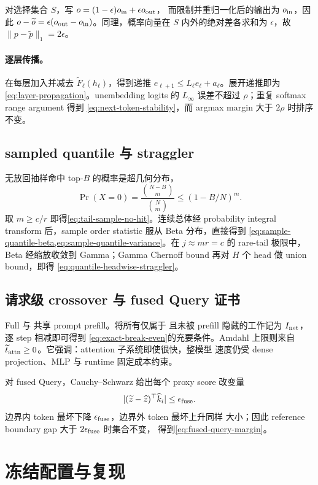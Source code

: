 对选择集合 $S$，写
$o=(1-\epsilon)o_{\rm in}+\epsilon o_{\rm out}$，
而限制并重归一化后的输出为 $o_{\rm in}$，因此
$o-\widetilde o=\epsilon(o_{\rm out}-o_{\rm in})$。同理，概率向量在
$S$ 内外的绝对差各求和为 $\epsilon$，故
$\|p-\widetilde p\|_1=2\epsilon$。

\paragraph{逐层传播。}
在每层加入并减去 $\widetilde F_\ell(h_\ell)$，得到递推
$e_{\ell+1}\le L_\ell e_\ell+a_\ell$。展开递推即为
\cref{eq:layer-propagation}。unembedding logits 的
$L_\infty$ 误差不超过 $\rho$；重复 softmax range argument 得到
\cref{eq:next-token-stability}，而 argmax margin 大于 $2\rho$ 时排序不变。

\subsection{sampled quantile 与 straggler}

无放回抽样命中 top-$B$ 的概率是超几何分布，
\[
 \Pr(X=0)=\frac{\binom{N-B}{m}}{\binom Nm}
 \le(1-B/N)^m.
\]
取 $m\ge c/r$ 即得\cref{eq:tail-sample-no-hit}。连续总体经 probability
integral transform 后，sample order statistic 服从 Beta 分布，直接得到
\cref{eq:sample-quantile-beta,eq:sample-quantile-variance}。在
$j\approx mr=c$ 的 rare-tail 极限中，Beta 经缩放收敛到 Gamma；Gamma
Chernoff bound 再对 $H$ 个 head 做 union bound，即得
\cref{eq:quantile-headwise-straggler}。

\subsection{请求级 crossover 与 fused Query 证书}

Full 与 \method 共享 prompt prefill。将所有仅属于 \method 且未被 prefill
隐藏的工作记为 $I_{\rm net}$，逐 step 相减即可得到
\cref{eq:exact-break-even}的充要条件。Amdahl 上限则来自
$\widetilde t_{\rm attn}\ge0$。它强调：attention 子系统即使很快，整模型
速度仍受 dense projection、MLP 与 runtime 固定成本约束。

对 fused Query，Cauchy--Schwarz 给出每个 proxy score 改变量
\[
 |(\widetilde z-\widehat z)^\top\widehat k_i|
 \le\epsilon_{\rm fuse}.
\]
边界内 token 最坏下降 $\epsilon_{\rm fuse}$，边界外 token 最坏上升同样
大小；因此 reference boundary gap 大于 $2\epsilon_{\rm fuse}$ 时集合不变，
得到\cref{eq:fused-query-margin}。

\clearpage
\section{冻结配置与复现}
\label{app:repro}

